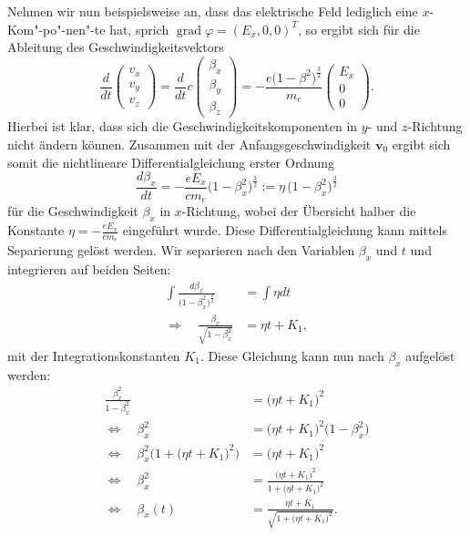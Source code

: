 Nehmen wir nun beispielsweise an,
dass das elektrische Feld lediglich eine \(x\)-Kom"-po"-nen"-te hat,
sprich \( \operatorname{grad} \varphi = (E_x, 0, 0)^T \),
so ergibt sich für die Ableitung des Geschwindigkeitsvektors
\begin{equation}
    \frac{d}{dt}
    \begin{pmatrix}
        v_x \\
        v_y \\
        v_z
    \end{pmatrix} =
    \frac{d}{dt} c
    \begin{pmatrix}
        \beta_x \\
        \beta_y \\
        \beta_z
    \end{pmatrix} =
    - \frac{e \bigl(1-\beta^2\bigr)^\frac{3}{2}}{m_e}
    \begin{pmatrix}
        E_x \\
        0 \\
        0
    \end{pmatrix}.
    \label{relativ:eqn:bsp-abl-v-vec}
\end{equation}
Hierbei ist klar, dass sich die Geschwindigkeitskomponenten
in \(y\)- und \(z\)-Richtung nicht ändern können.
Zusammen mit der Anfangsgeschwindigkeit \(\bm{v}_0\)
ergibt sich somit die nichtlineare Differentialgleichung erster Ordnung
\begin{equation}
    \frac{d\beta_x}{dt} = - \frac{e E_x}{c m_e} \bigl(1-\beta_x^2\bigr)^\frac{3}{2}
    := \eta \, \bigl(1-\beta_x^2\bigr)^\frac{3}{2}
\end{equation}
für die Geschwindigkeit \(\beta_x\) in \(x\)-Richtung,
wobei der Übersicht halber die Konstante
\(\eta=-\frac{e E_x}{c m_e}\) eingeführt wurde.
Diese Differentialgleichung kann mittels Separierung gelöst werden.
Wir separieren nach den Variablen \(\beta_x\) und \(t\)
und integrieren auf beiden Seiten:
\begin{align*}
    \int\frac{d\beta_x}{\bigl(1-\beta_x^2\bigr)^\frac{3}{2}}
    &= \int\eta dt \\
    \Rightarrow\quad\frac{\beta_x}{\sqrt{1-\beta_x^2}}
    &= \eta t + K_1,
\end{align*}
mit der Integrationskonstanten \(K_1\).
Diese Gleichung kann nun nach \(\beta_x\) aufgelöst werden:
\begin{align*}
    \frac{\beta_x^2}{1-\beta_x^2}
    &= \bigl(\eta t + K_1\bigr)^2\\
    \Leftrightarrow\quad \beta_x^2 &= \bigl(\eta t + K_1\bigr)^2
    \bigl(1-\beta_x^2\bigr)\\
    \Leftrightarrow\quad
    \beta_x^2 \bigl(1 + \bigl(\eta t + K_1\bigr)^2\bigr)
    &= \bigl(\eta t + K_1\bigr)^2\\
    \Leftrightarrow\quad
    \beta_x^2 &= \frac{\bigl(\eta t + K_1\bigr)^2}
    {1 + \bigl(\eta t + K_1\bigr)^2}\\
    \Leftrightarrow\quad
    \beta_x(t) &= \frac{\eta t + K_1}
    {\sqrt{1+\bigl(\eta t+K_1\bigr)^2}}.
\end{align*}

